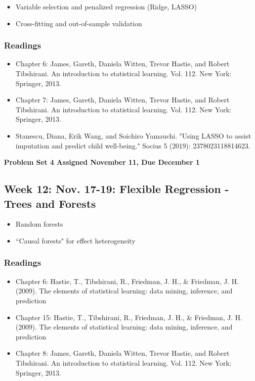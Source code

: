 \documentclass[11pt, article, oneside]{memoir}
\theoremstyle{Assumption}
\begin{document}
\begin{itemize}
\item Variable selection and penalized regression (Ridge, LASSO) 
\item Cross-fitting and out-of-sample validation
\end{itemize}

\subsubsection*{Readings}

\begin{itemize}
\item Chapter 6: James, Gareth, Daniela Witten, Trevor Hastie, and Robert Tibshirani. An introduction to statistical learning. Vol. 112. New York: Springer, 2013.
\item Chapter 7: James, Gareth, Daniela Witten, Trevor Hastie, and Robert Tibshirani. An introduction to statistical learning. Vol. 112. New York: Springer, 2013.
\item Stanescu, Diana, Erik Wang, and Soichiro Yamauchi. "Using LASSO to assist imputation and predict child well-being." Socius 5 (2019): 2378023118814623.
\end{itemize}

\textbf{Problem Set 4 Assigned November 11, Due December 1}

\subsection{Week 12: Nov. 17-19: Flexible Regression - Trees and Forests}

\begin{itemize}
\item Random forests
\item ``Causal forests" for effect heterogeneity
\end{itemize}

\subsubsection*{Readings}

\begin{itemize}
\item Chapter 6: Hastie, T., Tibshirani, R., Friedman, J. H., \& Friedman, J. H. (2009). The elements of statistical learning: data mining, inference, and prediction 
\item Chapter 15: Hastie, T., Tibshirani, R., Friedman, J. H., \& Friedman, J. H. (2009). The elements of statistical learning: data mining, inference, and prediction
\item Chapter 8: James, Gareth, Daniela Witten, Trevor Hastie, and Robert Tibshirani. An introduction to statistical learning. Vol. 112. New York: Springer, 2013.
\end{itemize}
\end{document}

